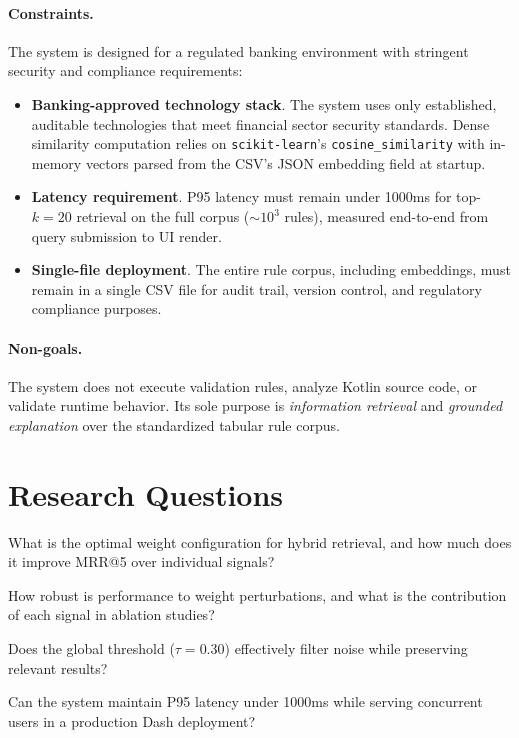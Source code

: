 \paragraph{Constraints.} The system is designed for a regulated banking environment with stringent security and compliance requirements:
\begin{itemize}[leftmargin=*,itemsep=2pt,topsep=2pt]
\item \textbf{Banking-approved technology stack}. The system uses only established, auditable technologies that meet financial sector security standards. Dense similarity computation relies on \texttt{scikit-learn}'s \texttt{cosine\_similarity} with in-memory vectors parsed from the CSV's JSON embedding field at startup.
\item \textbf{Latency requirement}. P95 latency must remain under 1000ms for top-$k{=}20$ retrieval on the full corpus (${\sim}10^3$ rules), measured end-to-end from query submission to UI render.
\item \textbf{Single-file deployment}. The entire rule corpus, including embeddings, must remain in a single CSV file for audit trail, version control, and regulatory compliance purposes.
\end{itemize}
\paragraph{Non-goals.} The system does not execute validation rules, analyze Kotlin source code, or validate runtime behavior. Its sole purpose is \emph{information retrieval} and \emph{grounded explanation} over the standardized tabular rule corpus.

\section{Research Questions}
\begin{description}[leftmargin=!,labelwidth=2.5cm,itemsep=2pt,topsep=2pt]
 \item[RQ1:] What is the optimal weight configuration for hybrid retrieval, and how much does it improve MRR@5 over individual signals?
 \item[RQ2:] How robust is performance to weight perturbations, and what is the contribution of each signal in ablation studies?
 \item[RQ3:] Does the global threshold ($\tau{=}0.30$) effectively filter noise while preserving relevant results?
 \item[RQ4:] Can the system maintain P95 latency under 1000ms while serving concurrent users in a production Dash deployment?
\end{description}

